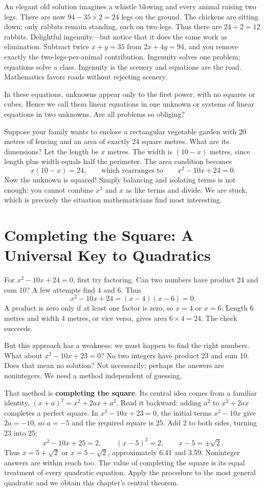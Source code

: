 An elegant old solution imagines a whistle blowing and every animal raising two legs. There are now $94 - 35 \times 2 = 24$ legs on the ground. The chickens are sitting down; only rabbits remain standing, each on two legs. Thus there are $24 \div 2 = 12$ rabbits. Delightful ingenuity---but notice that it does the same work as elimination. Subtract twice $x + y = 35$ from $2x + 4y = 94$, and you remove exactly the two-legs-per-animal contribution. Ingenuity solves one problem; equations solve a class. Ingenuity is the scenery and equations are the road. Mathematics favors roads without rejecting scenery.

In these equations, unknowns appear only to the first power, with no squares or cubes. Hence we call them linear equations in one unknown or systems of linear equations in two unknowns. Are all problems so obliging?

Suppose your family wants to enclose a rectangular vegetable garden with 20 metres of fencing and an area of exactly 24 square metres. What are its dimensions? Let the length be $x$ metres. The width is $(10 - x)$ metres, since length plus width equals half the perimeter. The area condition becomes
\[
x(10 - x) = 24,\qquad \text{which rearranges to}\qquad x^2 - 10x + 24 = 0.
\]
Now the unknown is squared! Simply balancing and isolating terms is not enough: you cannot combine $x^2$ and $x$ as like terms and divide. We are stuck, which is precisely the situation mathematicians find most interesting.

\section{Completing the Square: A Universal Key to Quadratics}

For $x^2 - 10x + 24 = 0$, first try factoring. Can two numbers have product 24 and sum 10? A few attempts find 4 and 6. Thus
\[
x^2 - 10x + 24 = (x - 4)(x - 6) = 0.
\]
A product is zero only if at least one factor is zero, so $x = 4$ or $x = 6$. Length 6 metres and width 4 metres, or vice versa, gives area $6 \times 4 = 24$. The check succeeds.

But this approach has a weakness: we must happen to find the right numbers. What about $x^2 - 10x + 23 = 0$? No two integers have product 23 and sum 10. Does that mean no solution? Not necessarily; perhaps the answers are nonintegers. We need a method independent of guessing.

That method is \textbf{completing the square}. Its central idea comes from a familiar identity, $(x + a)^2 = x^2 + 2ax + a^2$. Read it backward: adding $a^2$ to $x^2 + 2ax$ completes a perfect square. In $x^2 - 10x + 23 = 0$, the initial terms $x^2 - 10x$ give $2a = -10$, so $a = -5$ and the required square is $25$. Add 2 to both sides, turning 23 into 25:
\[
x^2 - 10x + 25 = 2,\qquad (x - 5)^2 = 2,\qquad x - 5 = \pm\sqrt{2}.
\]
Thus $x = 5 + \sqrt{2}$ or $x = 5 - \sqrt{2}$, approximately 6.41 and 3.59. Noninteger answers are within reach too. The value of completing the square is its equal treatment of every quadratic equation. Apply the procedure to the most general quadratic and we obtain this chapter's central theorem.

